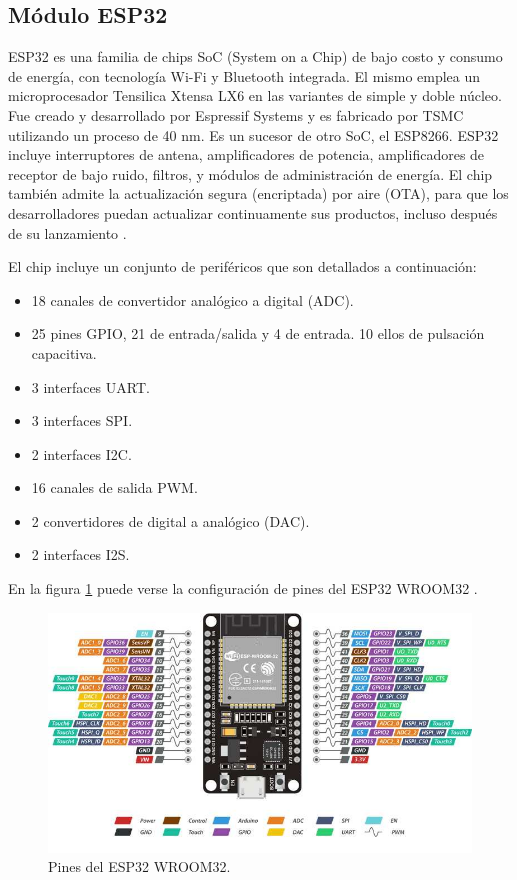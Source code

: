 \subsection{Módulo ESP32}

ESP32 es una familia de chips SoC (System on a Chip) de bajo costo y consumo de energía, con tecnología Wi-Fi y Bluetooth integrada. El mismo emplea un microprocesador Tensilica Xtensa LX6 en las variantes de simple y doble núcleo. Fue creado y desarrollado por Espressif Systems y es fabricado por TSMC utilizando un proceso de 40 nm. Es un sucesor de otro SoC, el ESP8266. ESP32 incluye interruptores de antena, amplificadores de potencia, amplificadores de receptor de bajo ruido, filtros, y módulos de administración de energía. El chip también admite la actualización segura (encriptada) por aire (OTA), para que los desarrolladores puedan actualizar continuamente sus productos, incluso después de su lanzamiento \citep{WEBSITE:esp21wroom}. 

El chip incluye un conjunto de periféricos que son detallados a continuación:
\begin{itemize}
\item 18 canales de convertidor analógico a digital (ADC).
\item 25 pines GPIO, 21 de entrada/salida y 4 de entrada. 10 ellos de pulsación capacitiva.
\item 3 interfaces UART.
\item 3 interfaces SPI.
\item 2 interfaces I2C.
\item 16 canales de salida PWM.
\item 2 convertidores de digital a analógico (DAC).
\item 2 interfaces I2S.
\end{itemize}


En la figura \ref{fig:esp32} puede verse la configuración de pines del ESP32 WROOM32 \citep{WEBSITE:pinesESP32}.

\begin{figure}[ht]
	\centering
	\includegraphics[width=1\textwidth]{./Figures/esp32.png}
	\caption{Pines del ESP32 WROOM32.}
	\label{fig:esp32}
\end{figure} 

